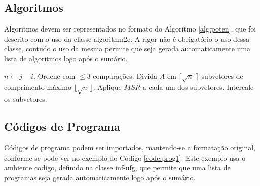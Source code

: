 \subsection{Algoritmos}
\label{sec:algor} 
Algoritmos devem ser representados no formato do Algoritmo \ref{alg:poten}, que foi descrito com o uso da classe \textsf{algorithm2e}. A rigor não é obrigatório o uso dessa classe, contudo o uso da mesma permite que seja gerada automaticamente uma lista de algoritmos logo após o sumário.

\medskip
\begin{center}
\begin{minipage}{0.92\textwidth}
\begin{algorithm2e}[H]
 \DontPrintSemicolon
 \LinesNumbered
 \SetAlgoLined
 \BlankLine
 \BlankLine
 $n \leftarrow j - i$.\;
   {Ordene com $\leq 3$ comparações.}
   {Divida $A$ em $\lceil\sqrt{n}\,\,\rceil$ subvetores de comprimento máximo $\lfloor\sqrt{n}\,\rfloor$.\;
    Aplique $MSR$ a cada um dos subvetores.\;
    Intercale os subvetores.\;}
\caption{$MSR(A,i,j)$ \label {alg:poten}}
\end{algorithm2e}
\end{minipage}
\end{center}

\subsection{Códigos de Programa}
\label{sec:progs} 
Códigos de programa podem ser importados, mantendo-se a formatação original, conforme se pode ver no exemplo do Código \ref{code:prog1}. Este exemplo usa o ambiente \textsf{codigo}, definido na classe \textsf{inf-ufg}, que permite que uma lista de programas seja gerada automaticamente logo após o sumário.
\begin{center}
 \begin{minipage}{0.7\textwidth}
  \begin{codigo}[H]
   \small
   \caption{\texttt{insertionsort()} }
   \label{code:prog1}
  \end{codigo}
 \end{minipage}
\end{center}

